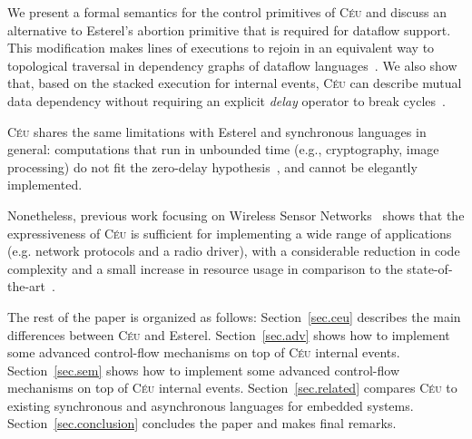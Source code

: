 \documentclass{acm_proc_article-sp}
\newcommand{\CEU}{\textsc{C\'{e}u}\xspace}
\newcommand{\1}{\;}
\newcommand{\2}{\;\;}
\newcommand{\3}{\;\;\;}
\newcommand{\5}{\;\;\;\;\;}
\begin{document}
We present a formal semantics for the control primitives of \CEU and discuss an
alternative to Esterel's abortion primitive that is required for dataflow 
support.
This modification makes lines of executions to rejoin in an equivalent way to 
topological traversal in dependency graphs of dataflow 
languages~\cite{rp.twelve,frp.survey}.
%
We also show that, based on the stacked execution for internal events, \CEU can 
describe mutual data dependency without requiring an explicit \emph{delay} 
operator to break cycles~\cite{frtime.embedding,luagravity.sblp}.


\CEU shares the same limitations with Esterel and synchronous languages in 
general:
computations that run in unbounded time (e.g., cryptography, image processing) 
do not fit the zero-delay hypothesis~\cite{rp.hypothesis}, and cannot be 
elegantly implemented.

Nonetheless, previous work focusing on Wireless Sensor 
Networks~\cite{ceu.sensys} shows that the expressiveness of \CEU is sufficient 
for implementing a wide range of applications (e.g. network protocols and a 
radio driver), with a considerable reduction in code complexity and a small 
increase in resource usage in comparison to the 
state-of-the-art~\cite{wsn.nesc}.

The rest of the paper is organized as follows:
Section~\ref{sec.ceu} describes the main differences between \CEU and 
Esterel.
Section~\ref{sec.adv} shows how to implement some advanced control-flow 
mechanisms on top of \CEU internal events.
Section~\ref{sec.sem} shows how to implement some advanced control-flow 
mechanisms on top of \CEU internal events.
Section~\ref{sec.related} compares \CEU to existing synchronous and 
asynchronous languages for embedded systems.
Section~\ref{sec.conclusion} concludes the paper and makes final remarks.
\end{document}

